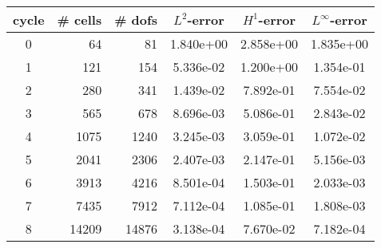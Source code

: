 \documentclass[10pt]{report}
\begin{document}
\begin{table}[H]
\begin{center}
\begin{tabular}{|c|r|r|c|c|c|} \hline
cycle & \# cells & \# dofs & $L^2$-error & $H^1$-error & $L^\infty$-error\\ \hline
0 & 64 & 81 & 1.840e+00 & 2.858e+00 & 1.835e+00\\ \hline
1 & 121 & 154 & 5.336e-02 & 1.200e+00 & 1.354e-01\\ \hline
2 & 280 & 341 & 1.439e-02 & 7.892e-01 & 7.554e-02\\ \hline
3 & 565 & 678 & 8.696e-03 & 5.086e-01 & 2.843e-02\\ \hline
4 & 1075 & 1240 & 3.245e-03 & 3.059e-01 & 1.072e-02\\ \hline
5 & 2041 & 2306 & 2.407e-03 & 2.147e-01 & 5.156e-03\\ \hline
6 & 3913 & 4216 & 8.501e-04 & 1.503e-01 & 2.033e-03\\ \hline
7 & 7435 & 7912 & 7.112e-04 & 1.085e-01 & 1.808e-03\\ \hline
8 & 14209 & 14876 & 3.138e-04 & 7.670e-02 & 7.182e-04\\ \hline
\end{tabular}
\end{center}
\end{table}
\end{document}
